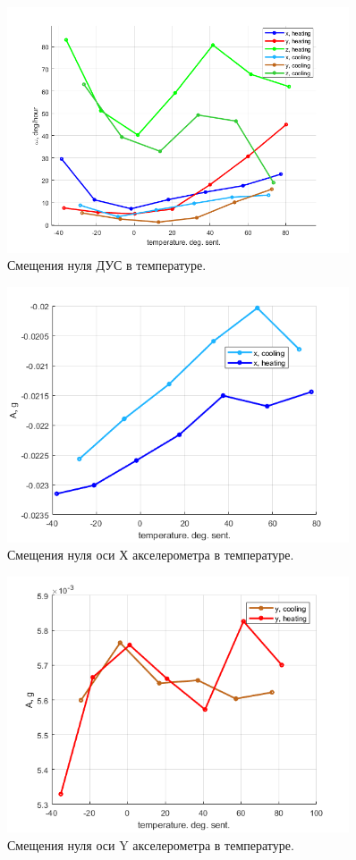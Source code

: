 \documentclass[a4paper,12pt]{article}
\begin{document}
\begin{figure}[hp!]
\centering
\includegraphics[width=0.9\textwidth]{gyro_bias_steps3.png}
\caption{\label{fig:gyro_bias_steps} Смещения нуля ДУС в температуре.}
\end{figure}
\begin{figure}[hp!]
\centering
\includegraphics[width=0.9\textwidth]{Ax_accel.png} 
\caption{\label{fig:Ax_accel} Смещения нуля оси Х акселерометра в температуре.}
\end{figure}
\begin{figure}[hp!]
\centering
\includegraphics[width=0.9\textwidth]{Ay_accel.png} 
\caption{\label{fig:Ay_accel} Смещения нуля оси Y акселерометра в температуре.}
\end{figure}
\end{document}
